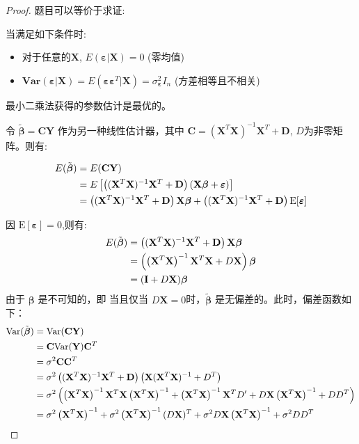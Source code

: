 \documentclass[UTF8]{article} %
\newcommand{\BoldEpsilon}{\boldsymbol{\varepsilon}}
\newcommand{\BoldBeta}{\boldsymbol{\beta}}
\newcommand{\TildeBeta}{\tilde{\boldsymbol{\beta}}}
\newcommand{\BaseX}{(\mathbf{X}^T \mathbf{X})^{-1}\mathbf{X}^T}
\newcommand{\CExpand}{\BaseX + \mathbf{D}}
\begin{document}
\begin{proof}
        题目可以等价于求证:

        当满足如下条件时:
        \begin{itemize}
            \item 对于任意的$\mathbf{X}$, $E(\BoldEpsilon | \mathbf{X}) = 0$ (零均值)
            \item $\mathbf{Var(\BoldEpsilon | \mathbf{X})} = E(\BoldEpsilon \BoldEpsilon^T | \mathbf{X}) = \sigma_{\mathbf{\varepsilon}}^2 I_{n}$ (方差相等且不相关)
        \end{itemize}
        最小二乘法获得的参数估计是最优的。

        令 $\TildeBeta = \mathbf{C} \mathbf{Y}$ 作为另一种线性估计器，其中 $\mathbf{C} = (\mathbf{X}^T \mathbf{X})^{-1}\mathbf{X}^T + \mathbf{D}$, $D$为非零矩阵。则有:

        \begin{align}
            E(\TildeBeta) &= E(\mathbf{C} \mathbf{Y}) \notag \\
            &= E\left[\left( \CExpand \right)(\mathbf{X} \BoldBeta+\BoldEpsilon)\right] \notag \\
            &= \left( \CExpand \right) \mathbf{X} \BoldBeta+\left( \CExpand \right) \mathrm{E}[\BoldEpsilon]
        \end{align}

        因 $\mathrm{E}[\BoldEpsilon] = 0$,则有:
        \begin{align}
            E(\TildeBeta) &= \left( \CExpand \right) \mathbf{X} \BoldBeta \notag \\
            &= \left(\left(\mathbf{X}^T \mathbf{X}\right)^{-1} \mathbf{X}^T \mathbf{X} + D\mathbf{X}\right) \BoldBeta \notag \\
            &= (\mathbf{I} + D \mathbf{X}) \BoldBeta
        \end{align}
        由于 $\BoldBeta$ 是不可知的，即 当且仅当 $D \mathbf{X} = 0$时，$\TildeBeta$ 是无偏差的。此时，偏差函数如下：
        \begin{align}
            \mathrm{Var}(\TildeBeta) &= \mathrm{Var}(\mathbf{C} \mathbf{Y}) \notag \\
            &= \mathbf{C} \mathrm{Var}(\mathbf{Y}) \mathbf{C}^T \notag \\
            &= \sigma^{2} \mathbf{C} \mathbf{C}^T \notag \\
            &= \sigma^{2} \left( \CExpand \right) \left( \mathbf{X} (\mathbf{X}^T \mathbf{X})^{-1} + D^T \right) \notag \\
            &= \sigma^{2}\left(\left(\mathbf{X}^T \mathbf{X}\right)^{-1} \mathbf{X}^T \mathbf{X}\left(\mathbf{X}^T \mathbf{X}\right)^{-1}+\left(\mathbf{X}^T \mathbf{X}\right)^{-1} \mathbf{X}^T D^{\prime}+D \mathbf{X}\left(\mathbf{X}^T \mathbf{X}\right)^{-1}+D D^T\right) \notag \\
            &= \sigma^{2}\left(\mathbf{X}^T \mathbf{X}\right)^{-1}+\sigma^{2}\left(\mathbf{X}^T \mathbf{X}\right)^{-1}(D \mathbf{X})^T+\sigma^{2} D \mathbf{X}\left(\mathbf{X}^T \mathbf{X}\right)^{-1}+\sigma^{2} D D^T
        \end{align}


\end{proof}
\end{document}

